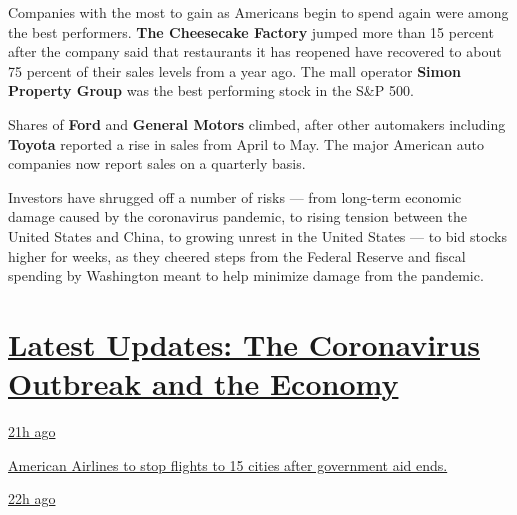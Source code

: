 Companies with the most to gain as Americans begin to spend again were
among the best performers. \textbf{The Cheesecake Factory} jumped more
than 15 percent after the company said that restaurants it has reopened
have recovered to about 75 percent of their sales levels from a year
ago. The mall operator \textbf{Simon Property Group} was the best
performing stock in the S\&P 500.

Shares of \textbf{Ford} and \textbf{General Motors} climbed, after other
automakers including \textbf{Toyota} reported a rise in sales from April
to May. The major American auto companies now report sales on a
quarterly basis.

Investors have shrugged off a number of risks --- from long-term
economic damage caused by the coronavirus pandemic, to rising tension
between the United States and China, to growing unrest in the United
States --- to bid stocks higher for weeks, as they cheered steps from
the Federal Reserve and fiscal spending by Washington meant to help
minimize damage from the pandemic.

\hypertarget{latest-updates-the-coronavirus-outbreak-and-the-economy}{%
\section{\texorpdfstring{\href{https://www.nytimes3xbfgragh.onion/live/2020/08/20/business/stock-market-today-coronavirus?action=click\&pgtype=Article\&state=default\&region=MAIN_CONTENT_1\&context=storylines_live_updates}{Latest
Updates: The Coronavirus Outbreak and the
Economy}}{Latest Updates: The Coronavirus Outbreak and the Economy}}\label{latest-updates-the-coronavirus-outbreak-and-the-economy}}

\href{https://www.nytimes3xbfgragh.onion/live/2020/08/20/business/stock-market-today-coronavirus?action=click\&pgtype=Article\&state=default\&region=MAIN_CONTENT_1\&context=storylines_live_updates\#american-airlines-to-stop-flights-to-15-cities-after-government-aid-ends}{21h
ago}

\href{https://www.nytimes3xbfgragh.onion/live/2020/08/20/business/stock-market-today-coronavirus?action=click\&pgtype=Article\&state=default\&region=MAIN_CONTENT_1\&context=storylines_live_updates\#american-airlines-to-stop-flights-to-15-cities-after-government-aid-ends}{American
Airlines to stop flights to 15 cities after government aid ends.}

\href{https://www.nytimes3xbfgragh.onion/live/2020/08/20/business/stock-market-today-coronavirus?action=click\&pgtype=Article\&state=default\&region=MAIN_CONTENT_1\&context=storylines_live_updates\#without-school-plays-and-assemblies-a-technicians-livelihood-withers}{22h
ago}

